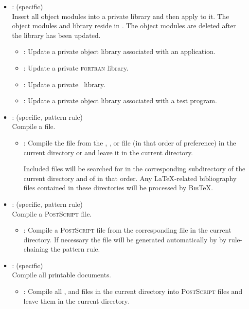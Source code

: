 \begin{itemize}
\item
    : (specific)
   \\ Insert all object modules into a private library and then apply
    to it.  The object modules and library reside in
   .  The object modules are deleted after the library
   has been updated.
   \begin{itemize}
   \item
      : Update a private object library associated with an
      application.
   \item
      : Update a private \textsc{fortran} library.
   \item
      : Update a private \cplusplus\ library.
   \item
      : Update a private object library associated with a test
      program.
   \end{itemize}

\item
    : (specific, pattern rule)
   \\ Compile a  file.
   \begin{itemize}
   \item
      : Compile the  file from the ,
      , or  file (in that order of preference) in the
      current directory or  and leave it in the current
      directory.

      Included files will be searched for in the corresponding 
      subdirectory of the current directory and of  in that
      order.  Any \LaTeX-related  bibliography files
      contained in these directories will be processed by \textsc{Bib}\TeX.
   \end{itemize}

\item
    : (specific, pattern rule)
   \\ Compile a  \textsc{PostScript} file.
   \begin{itemize}
   \item
      : Compile a  \textsc{PostScript} file from the
      corresponding  file in the current directory.  If necessary
      the  file will be generated automatically by 
      by rule-chaining the  pattern rule.
   \end{itemize}

\item
    : (specific)
   \\ Compile all printable documents.
   \begin{itemize}
   \item
      : Compile all ,  and 
      files in the current directory into  \textsc{PostScript} files
      and leave them in the current directory.
   \end{itemize}
\end{itemize}

